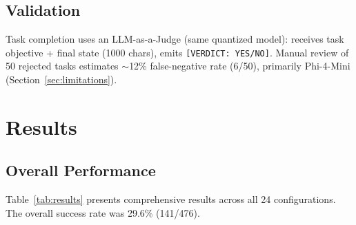 \documentclass{article}
\begin{document}
\subsection{Validation}

Task completion uses an LLM-as-a-Judge (same quantized model): receives task objective + final state (1000 chars), emits \texttt{[VERDICT: YES/NO]}. Manual review of 50 rejected tasks estimates $\sim$12\% false-negative rate (6/50), primarily Phi-4-Mini (Section~\ref{sec:limitations}).

\section{Results}

\subsection{Overall Performance}

Table~\ref{tab:results} presents comprehensive results across all 24 configurations. The overall success rate was 29.6\% (141/476).
\end{document}
